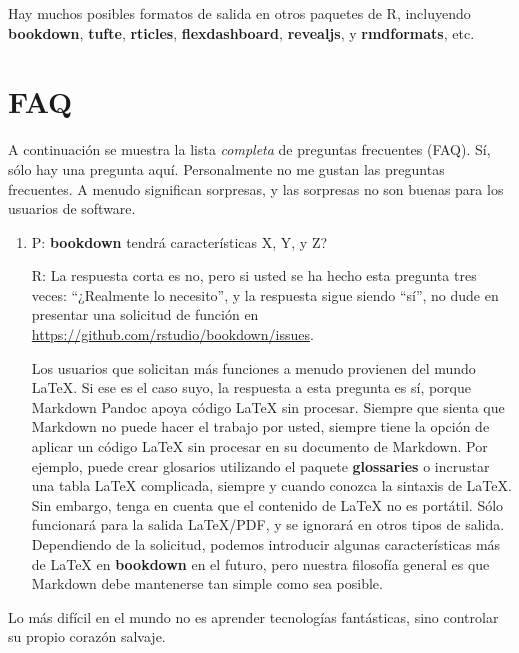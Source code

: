 \documentclass[12pt,]{krantz}
\theoremstyle{definition}
\theoremstyle{definition}
\theoremstyle{definition}
\theoremstyle{remark}
\begin{document}
Hay muchos posibles formatos de salida en otros paquetes de R,
incluyendo \textbf{bookdown}, \textbf{tufte}, \textbf{rticles},
\textbf{flexdashboard}, \textbf{revealjs}, y \textbf{rmdformats}, etc.

\chapter{FAQ}\label{faq}

A continuación se muestra la lista \emph{completa} de preguntas
frecuentes (FAQ). Sí, sólo hay una pregunta aquí. Personalmente no me
gustan las preguntas frecuentes. A menudo significan sorpresas, y las
sorpresas no son buenas para los usuarios de software.

\begin{enumerate}
\def\labelenumi{\arabic{enumi}.}
\item
  P: \textbf{bookdown} tendrá características X, Y, y Z?

  R: La respuesta corta es no, pero si usted se ha hecho esta pregunta
  tres veces: ``¿Realmente lo necesito'', y la respuesta sigue siendo
  ``sí'', no dude en presentar una solicitud de función en
  \url{https://github.com/rstudio/bookdown/issues}.

  Los usuarios que solicitan más funciones a menudo provienen del mundo
  LaTeX. Si ese es el caso suyo, la respuesta a esta pregunta es sí,
  porque Markdown Pandoc apoya código LaTeX sin procesar. Siempre que
  sienta que Markdown no puede hacer el trabajo por usted, siempre tiene
  la opción de aplicar un código LaTeX sin procesar en su documento de
  Markdown. Por ejemplo, puede crear glosarios utilizando el paquete
  \textbf{glossaries} o incrustar una tabla LaTeX complicada, siempre y
  cuando conozca la sintaxis de LaTeX. Sin embargo, tenga en cuenta que
  el contenido de LaTeX no es portátil. Sólo funcionará para la salida
  LaTeX/PDF, y se ignorará en otros tipos de salida. Dependiendo de la
  solicitud, podemos introducir algunas características más de LaTeX en
  \textbf{bookdown} en el futuro, pero nuestra filosofía general es que
  Markdown debe mantenerse tan simple como sea posible.
\end{enumerate}

Lo más difícil en el mundo no es aprender tecnologías fantásticas, sino
controlar su propio corazón salvaje.



\backmatter
\printindex
\end{document}
